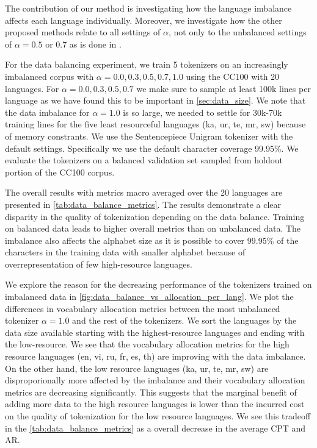 The contribution of our method is investigating how the language imbalance affects each language individually. Moreover, we investigate how the other proposed methods relate to all settings of $\alpha$, not only to the unbalanced settings of $\alpha=0.5 \textrm{ or } 0.7$ as is done in \citet{chung_improving_2020,zheng_allocating_2021,liang_xlm-v_2023}.

For the data balancing experiment, we train 5 tokenizers on an increasingly imbalanced corpus with $\alpha = 0.0, 0.3, 0.5, 0.7, 1.0$ using the CC100 with 20 languages. For $\alpha = 0.0, 0.3, 0.5, 0.7$ we make sure to sample at least 100k lines per language as we have found this to be important in \autoref{sec:data_size}. We note that the data imbalance for $\alpha=1.0$ is so large, we needed to settle for 30k-70k training lines for the five least resourceful languages (ka, ur, te, mr, sw) because of memory constrants. We use the Sentencepiece Unigram tokenizer with the default settings. Specifically we use the default character coverage 99.95\%. We evaluate the tokenizers on a balanced validation set sampled from holdout portion of the CC100 corpus. 

The overall results with metrics macro averaged over the 20 languages are presented in \autoref{tab:data_balance_metrics}. The results demonstrate a clear disparity in the quality of tokenization depending on the data balance. Training on balanced data leads to higher overall metrics than on unbalanced data. The imbalance also affects the alphabet size as it is possible to cover 99.95\% of the characters in the training data with smaller alphabet because of overrepresentation of few high-resource languages.

We explore the reason for the decreasing performance of the tokenizers trained on imbalanced data in \autoref{fig:data_balance_vs_allocation_per_lang}. We plot the differences in vocabulary allocation metrics between the most unbalanced tokenizer $\alpha=1.0$ and the rest of the tokenizers. We sort the languages by the data size available starting with the highest-resource languages and ending with the low-resource. We see that the vocabulary allocation metrics for the high resource languages (en, vi, ru, fr, es, th) are improving with the data imbalance. On the other hand, the low resource languages (ka, ur, te, mr, sw) are disproporionally more affected by the imbalance and their vocabulary allocation metrics are decreasing significantly. This suggests that the marginal benefit of adding more data to the high resource languages is lower than the incurred cost on the quality of tokenization for the low resource languages. We see this tradeoff in the \autoref{tab:data_balance_metrics} as a overall decrease in the average CPT and AR.

